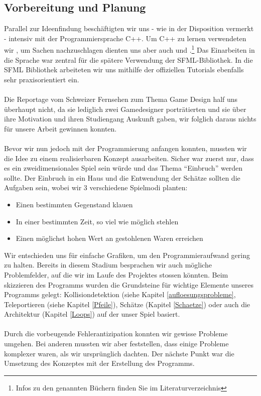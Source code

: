 \documentclass[11pt,a4paper]{scrbook}
\newcommand{\q}[1]{``#1''}
\begin{document}
\subsection{Vorbereitung und Planung}
Parallel zur Ideenfindung beschäftigten wir uns - wie in der
Disposition vermerkt - intensiv mit der Programmiersprache C++. Um C++ zu lernen verwendeten wir \cite{cpp_grundkurs}, um Sachen nachzuschlagen dienten uns aber auch \cite{cpp_referenz} und \cite{cpp_com}.\footnote{Infos zu den genannten Büchern finden Sie im Literaturverzeichnis} Das Einarbeiten in die Sprache war zentral für die spätere Verwendung der SFML-Bibliothek. In die SFML Bibliothek arbeiteten wir uns mithilfe der offiziellen Tutorials \cite{sfml_tutorials} ebenfalls sehr praxisorientiert ein.\\
\\
Die Reportage vom Schweizer Fernsehen \cite{sf_gamedesign} zum Thema Game Design half uns überhaupt nicht, da sie lediglich zwei Gamedesigner porträtierten und sie über ihre Motivation und ihren Studiengang Auskunft gaben, wir folglich daraus nichts für unsere Arbeit gewinnen konnten.\\
\\
Bevor wir nun jedoch mit der Programmierung anfangen konnten, mussten wir die Idee zu einem realisierbaren Konzept ausarbeiten.
Sicher war zuerst nur, dass es ein zweidimensionales Spiel sein würde und das Thema \q{Einbruch} werden sollte.
Der Einbruch in ein Haus und die Entwendung der Schätze sollten die Aufgaben sein, wobei wir 3 verschiedene Spielmodi planten:
\begin{itemize}
\item Einen bestimmten Gegenstand klauen
\item In einer bestimmten Zeit, so viel wie möglich stehlen
\item Einen möglichst hohen Wert an gestohlenen Waren erreichen
\end{itemize}
Wir entschieden uns für einfache Grafiken, um den Programmieraufwand gering zu halten. 
Bereits in diesem Stadium besprachen wir auch mögliche Problemfelder, auf die wir im Laufe des Projektes stossen könnten.
Beim skizzieren des Programms wurden die Grundsteine für wichtige Elemente unseres Programms gelegt: Kollisiondetektion (siehe Kapitel \ref{aufloesungsprobleme}, Teleportieren (siehe Kapitel \ref{Pfeile}), Schätze (Kapitel \ref{Schaetze}) oder auch die Architektur (Kapitel \ref{Loops}) auf der unser Spiel basiert.\\
\\
Durch die vorbeugende Fehlerantizipation konnten wir gewisse Probleme umgehen. Bei anderen mussten wir aber feststellen, dass einige Probleme komplexer waren, als wir ursprünglich dachten.
Der nächste Punkt war die Umsetzung des Konzeptes mit der Erstellung des Programms.
\end{document}
